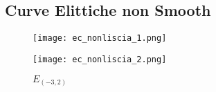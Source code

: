\newpage
\subsection{Curve Elittiche non Smooth}

\begin{figure}[h]
    \centering
    \begin{minipage}[t]{0.45\textwidth}
        \centering
        \texttt{[image: ec\_nonliscia\_1.png]}
        \caption{$E_{(0, 0)}$}
    \end{minipage}
    \hfill
    \begin{minipage}[t]{0.45\textwidth}
        \centering
        \texttt{[image: ec\_nonliscia\_2.png]}
        \caption{$E_{(-3, 2)}$}
    \end{minipage}
\end{figure}

